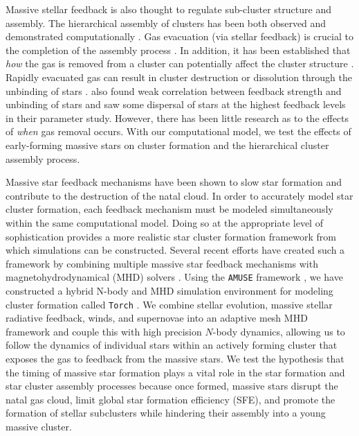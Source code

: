 \documentclass[twoside]{drexel-thesis}
\begin{document}
\begin{thesis}
Massive stellar feedback is also thought to regulate sub-cluster structure and assembly. The hierarchical assembly of clusters has been both observed \citep{bressert_spatial_2010, longmore_formation_2014, gouliermis_hierarchical_2017} and demonstrated computationally \citep{maschberger_properties_2010, howard_universal_2018, grudic_top_2018, vazquez-semadeni_hierarchical_2017, vazquez-semadeni_global_2019, chen_effects_2021, dobbs_formation_2022, guszejnov_cluster_2022}. Gas evacuation (via stellar feedback) is crucial to the completion of the assembly process \citep{grudic_top_2018,krause_physics_2020}. In addition, it has been established that \emph{how} the gas is removed from a cluster can potentially affect the cluster structure \citep{smith_infant_2013}. Rapidly evacuated gas can result in cluster destruction or dissolution through the unbinding of stars \citep{lada_embedded_2003,portegies_zwart_young_2010, banerjee_how_2017}. \citet{gavagnin_star_2017} also found weak correlation between feedback strength and unbinding of stars and \citet{li_disruption_2019} saw some dispersal of stars at the highest feedback levels in their parameter study. However, there has been little research as to the effects of \emph{when} gas removal occurs. With our computational model, we test the effects of early-forming massive stars on cluster formation and the hierarchical cluster assembly process.
 
Massive star feedback mechanisms have been shown to slow star formation and contribute to the destruction of the natal cloud. In order to accurately model star cluster formation, each feedback mechanism must be modeled simultaneously within the same computational model. Doing so at the appropriate level of sophistication provides a more realistic star cluster formation framework from which simulations can be constructed. Several recent efforts have created such a framework by combining multiple massive star feedback mechanisms with magnetohydrodynamical (MHD) solvers  \citep{rogers_feedback_2013, dale_before_2014,lancaster_star_2021,grudic_starforge_2021}. Using the \texttt{AMUSE} framework \citep{portegies_zwart_multiphysics_2009, portegies_zwart_multi-physics_2013, pelupessy_astrophysical_2013, portegies_zwart_astrophysical_2018}, we have constructed a hybrid N-body and MHD simulation environment for modeling cluster formation called \texttt{Torch} \citep{wall_collisional_2019,wall_modeling_2020}. 
We combine stellar evolution, massive stellar radiative feedback, winds, and supernovae into an adaptive mesh MHD framework and couple this with high precision $N$-body dynamics, allowing us to follow the dynamics of individual stars within an actively forming cluster that exposes the gas to feedback from the massive stars. We test the hypothesis that the timing of massive star formation plays a vital role in the star formation and star cluster assembly processes because once formed, massive stars disrupt the natal gas cloud, limit global star formation efficiency (SFE), and promote the formation of stellar subclusters while hindering their assembly into a young massive cluster.


\end{thesis}
\end{document}
